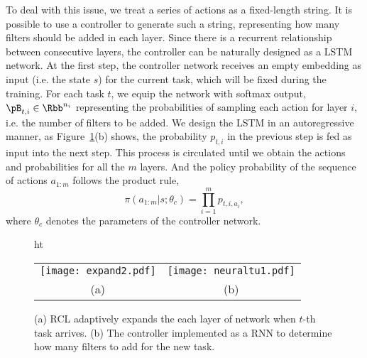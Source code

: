 \documentclass{article}
\begin{document}
To deal with this issue, we treat a series of actions as a fixed-length string. It is possible to use a controller to generate such a string, representing how many filters should be added in each layer. 
Since there is a recurrent relationship between consecutive layers, the controller can be naturally  designed  as a LSTM network.  At the first step, the controller
network receives an empty embedding as input (i.e. the state $s$) for the current task, which will be fixed during the training.  
For each task $t$, we equip the network with softmax output, $\pB_{t,i} \in \Rbb^{n_i}$ representing the probabilities of sampling each action for layer $i$, i.e. the number of filters to be added.  We design the LSTM in an autoregressive manner,  as Figure~\ref{fig:rcl}(b) shows, the probability $p_{t,i}$ in the previous step is fed as input into the next step. This process is circulated until we obtain  the actions and probabilities for  all the $m$ layers. And the policy probability of the sequence of actions $a_{1:m}$ follows the product rule,  
\begin{equation}
\pi(a_{1:m}|s;\theta_c) = \prod_{i=1}^{m} p_{t,i,a_i},
\end{equation}
 where $\theta_c$ denotes the parameters of the controller network. 





\begin{figure}{ht}
		\centering
    \begin{tabular}{cc}
		\texttt{[image: expand2.pdf]} & \texttt{[image: neuraltu1.pdf]} \\ 
    (a) & (b)
    \end{tabular}
    \vspace{-0.3cm}
 		 \caption{(a) RCL adaptively expands the each layer of network when $t$-th task arrives. (b) The controller implemented as a RNN to determine how many filters to add for the new task.}
		\label{fig:rcl}
\end{figure}
\end{document}
